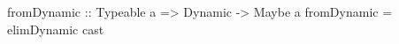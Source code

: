 \begin{code}
fromDynamic :: Typeable a => Dynamic -> Maybe a
fromDynamic = elimDynamic cast
\end{code}
